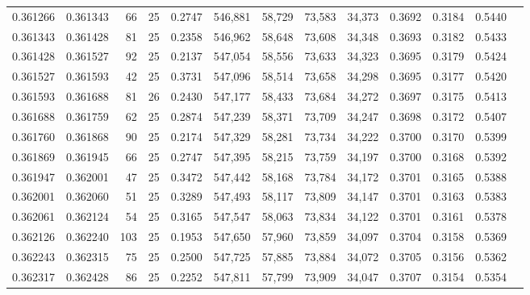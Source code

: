 \begin{tabular}{rrrrrrrrrrrrr}
0.361266 & 0.361343 &    66 &  25 &                                     0.2747 & 546,881 &  58,729 &  73,583 &  34,373 & 0.3692 & 0.3184 & 0.5440 \\
0.361343 & 0.361428 &    81 &  25 &                                     0.2358 & 546,962 &  58,648 &  73,608 &  34,348 & 0.3693 & 0.3182 & 0.5433 \\
0.361428 & 0.361527 &    92 &  25 &                                     0.2137 & 547,054 &  58,556 &  73,633 &  34,323 & 0.3695 & 0.3179 & 0.5424 \\
0.361527 & 0.361593 &    42 &  25 &                                     0.3731 & 547,096 &  58,514 &  73,658 &  34,298 & 0.3695 & 0.3177 & 0.5420 \\
0.361593 & 0.361688 &    81 &  26 &                                     0.2430 & 547,177 &  58,433 &  73,684 &  34,272 & 0.3697 & 0.3175 & 0.5413 \\
0.361688 & 0.361759 &    62 &  25 &                                     0.2874 & 547,239 &  58,371 &  73,709 &  34,247 & 0.3698 & 0.3172 & 0.5407 \\
0.361760 & 0.361868 &    90 &  25 &                                     0.2174 & 547,329 &  58,281 &  73,734 &  34,222 & 0.3700 & 0.3170 & 0.5399 \\
0.361869 & 0.361945 &    66 &  25 &                                     0.2747 & 547,395 &  58,215 &  73,759 &  34,197 & 0.3700 & 0.3168 & 0.5392 \\
0.361947 & 0.362001 &    47 &  25 &                                     0.3472 & 547,442 &  58,168 &  73,784 &  34,172 & 0.3701 & 0.3165 & 0.5388 \\
0.362001 & 0.362060 &    51 &  25 &                                     0.3289 & 547,493 &  58,117 &  73,809 &  34,147 & 0.3701 & 0.3163 & 0.5383 \\
0.362061 & 0.362124 &    54 &  25 &                                     0.3165 & 547,547 &  58,063 &  73,834 &  34,122 & 0.3701 & 0.3161 & 0.5378 \\
0.362126 & 0.362240 &   103 &  25 &                                     0.1953 & 547,650 &  57,960 &  73,859 &  34,097 & 0.3704 & 0.3158 & 0.5369 \\
0.362243 & 0.362315 &    75 &  25 &                                     0.2500 & 547,725 &  57,885 &  73,884 &  34,072 & 0.3705 & 0.3156 & 0.5362 \\
0.362317 & 0.362428 &    86 &  25 &                                     0.2252 & 547,811 &  57,799 &  73,909 &  34,047 & 0.3707 & 0.3154 & 0.5354 \\

\end{tabular}
